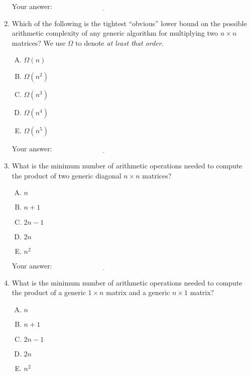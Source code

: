 \documentclass[10pt]{amsart}
\begin{document}
\begin{enumerate}
  \vspace{0.1in}
  Your answer: $\underline{\qquad\qquad\qquad\qquad\qquad\qquad\qquad}$
  \vspace{0.1in}

\item Which of the following is the tightest ``obvious'' lower bound
  on the possible arithmetic complexity of any generic algorithm for
  multiplying two $n \times n$ matrices? We use $\Omega$ to denote
  {\em at least that order}.

  \begin{enumerate}[(A)]
  \item $\Omega(n)$
  \item $\Omega(n^2)$
  \item $\Omega(n^3)$
  \item $\Omega(n^4)$
  \item $\Omega(n^5)$
  \end{enumerate}

  \vspace{0.1in}
  Your answer: $\underline{\qquad\qquad\qquad\qquad\qquad\qquad\qquad}$
  \vspace{0.1in}

\item What is the minimum number of arithmetic operations needed to
  compute the product of two generic diagonal $n \times n$ matrices?

  \begin{enumerate}[(A)]
  \item $n$
  \item $n + 1$
  \item $2n - 1$
  \item $2n$
  \item $n^2$
  \end{enumerate}

  \vspace{0.1in}
  Your answer: $\underline{\qquad\qquad\qquad\qquad\qquad\qquad\qquad}$
  \vspace{0.1in}

\item What is the minimum number of arithmetic operations needed to
  compute the product of a generic $1 \times n$ matrix and a generic
  $n \times 1$ matrix?

  \begin{enumerate}[(A)]
  \item $n$
  \item $n + 1$
  \item $2n - 1$
  \item $2n$
  \item $n^2$
  \end{enumerate}


\end{enumerate}
\end{document}
